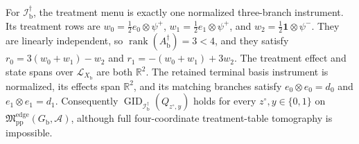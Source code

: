 For \(\mathcal I_{\mathrm b}^{\dagger}\), the treatment menu is exactly one normalized three-branch instrument. Its treatment rows are \(w_0=\tfrac12e_0\otimes\psi^{+}\), \(w_1=\tfrac12e_1\otimes\psi^{+}\), and \(w_2=\tfrac12\mathbf 1\otimes\psi^{-}\). They are linearly independent, so \(\operatorname{rank}(A_{\mathrm b}^{\dagger})=3<4\), and they satisfy \(r_0=3(w_0+w_1)-w_2\) and \(r_1=-(w_0+w_1)+3w_2\). The treatment effect and state spans over \(\mathcal L_{X_{\mathrm b}}\) are both \(\mathbb R^2\). The retained terminal basis instrument is normalized, its effects span \(\mathbb R^2\), and its matching branches satisfy \(e_0\otimes e_0=d_0\) and \(e_1\otimes e_1=d_1\). Consequently \(\operatorname{GID}_{\mathcal I_{\mathrm b}^{\dagger}}(Q_{z^{\circ},y})\) holds for every \(z^{\circ},y\in\{0,1\}\) on \(\mathfrak M_{\mathrm{pp}}^{\mathrm{edge}}(G_{\mathrm b},\mathcal A)\), although full four-coordinate treatment-table tomography is impossible.